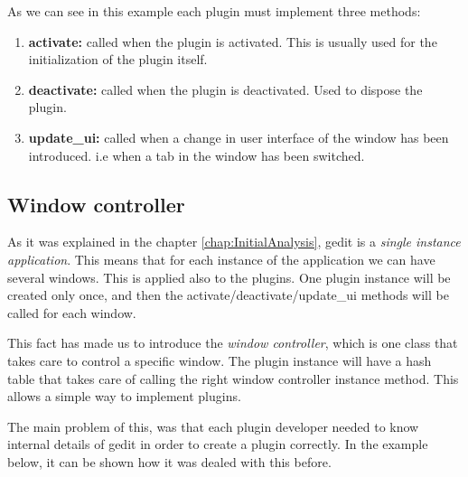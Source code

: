 As we can see in this example each plugin must implement three methods:
\begin{enumerate}
  \item \textbf{activate:} called when the plugin is activated. This is usually used for the initialization of the plugin itself.
  \item \textbf{deactivate:} called when the plugin is deactivated. Used to dispose the plugin.
  \item \textbf{update\_ui:} called when a change in user interface of the window has been introduced. i.e when a tab in the window has been switched.
\end{enumerate}

\subsection{Window controller}\label{sec:WindowController}

As it was explained in the chapter \ref{chap:InitialAnalysis}, gedit is a \emph{single instance application}. This means that for each instance of the application we can have several windows. This is applied also to the plugins. One plugin instance will be created only once, and then the activate/deactivate/update\_ui methods will be called for each window.

This fact has made us to introduce the \emph{window controller}, which is one class that takes care to control a specific window. The plugin instance will have a hash table that takes care of calling the right window controller instance method. This allows a simple way to implement plugins.

The main problem of this, was that each plugin developer needed to know internal details of gedit in order to create a plugin correctly. In the example below, it can be shown how it was dealed with this before.

